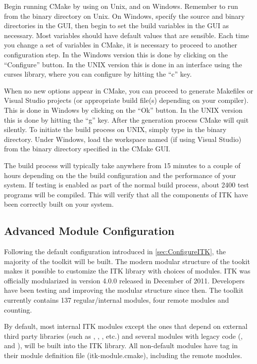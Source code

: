 Begin running CMake by using  on Unix, and  on
Windows.  Remember to run  from the binary directory on Unix. On
Windows, specify the source and binary directories in the GUI, then begin to
set the build variables in the GUI as necessary.  Most variables should have
default values that are sensible. Each time you change a set of variables in
CMake, it is necessary to proceed to another configuration step. In the
Windows version this is done by clicking on the ``Configure'' button. In the
UNIX version this is done in an interface using the curses library, where you
can configure by hitting the ``c'' key.

When no new options appear in CMake, you can proceed to generate Makefiles or
Visual Studio projects (or appropriate build file(s) depending on your
compiler). This is done in Windows by clicking on the ``Ok'' button.  In the
UNIX version this is done by hitting the ``g'' key. After the generation
process CMake will quit silently. To initiate the build process on UNIX,
simply type  in the binary directory. Under Windows, load the
workspace named  (if using Visual Studio) from the binary
directory specified in the CMake GUI.

The build process will typically take anywhere from 15 minutes to a couple of
hours depending on the the build configuration and the performance of your
system. If testing is enabled as part of the normal build process,
about 2400 test programs will be compiled. This will verify that all the
components of ITK have been correctly built on your system.


\subsection{Advanced Module Configuration}
\label{sec:ModuleConfiguration}
Following the default configuration introduced in \ref{sec:ConfigureITK},
the majority of the toolkit will be built. The modern modular structure of the
tookit makes it possible to customize the ITK library with choices of modules.
ITK was officially modularized in version 4.0.0 released in December of 2011.
Developers have been testing and improving the modular structure since then.
The toolkit currently contains 137 regular/internal modules, four remote
modules and counting.

By default, most internal ITK modules except the ones that depend on external
third party libraries (such as , ,
, etc.) and several  modules with legacy code
(,  and ),  will
be built into the ITK library. All non-default modules have
 tag in their module definition file
(itk-module.cmake), including the remote modules.

